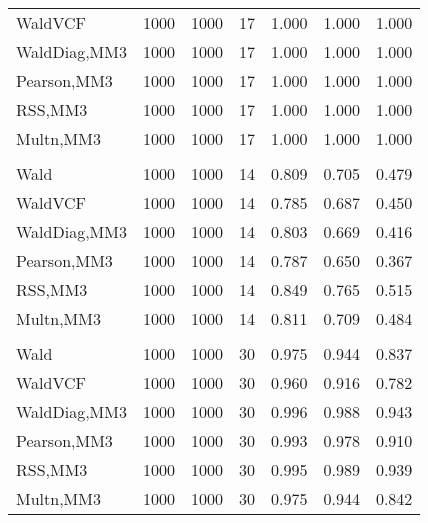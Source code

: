 \documentclass[
]{article}
\begin{document}
\begin{table}[H]
{\begin{tabular}[t]{lrrrrrr}
\hspace{1em}WaldVCF & 1000 & 1000 & 17 & 1.000 & 1.000 & 1.000\\
\hspace{1em}WaldDiag,MM3 & 1000 & 1000 & 17 & 1.000 & 1.000 & 1.000\\
\hspace{1em}Pearson,MM3 & 1000 & 1000 & 17 & 1.000 & 1.000 & 1.000\\
\hspace{1em}RSS,MM3 & 1000 & 1000 & 17 & 1.000 & 1.000 & 1.000\\
\hspace{1em}Multn,MM3 & 1000 & 1000 & 17 & 1.000 & 1.000 & 1.000\\
\addlinespace[0.3em]
\multicolumn{7}{l}{\textbf{2F 10V}}\\
\hspace{1em}Wald & 1000 & 1000 & 14 & 0.809 & 0.705 & 0.479\\
\hspace{1em}WaldVCF & 1000 & 1000 & 14 & 0.785 & 0.687 & 0.450\\
\hspace{1em}WaldDiag,MM3 & 1000 & 1000 & 14 & 0.803 & 0.669 & 0.416\\
\hspace{1em}Pearson,MM3 & 1000 & 1000 & 14 & 0.787 & 0.650 & 0.367\\
\hspace{1em}RSS,MM3 & 1000 & 1000 & 14 & 0.849 & 0.765 & 0.515\\
\hspace{1em}Multn,MM3 & 1000 & 1000 & 14 & 0.811 & 0.709 & 0.484\\
\addlinespace[0.3em]
\multicolumn{7}{l}{\textbf{3F 15V}}\\
\hspace{1em}Wald & 1000 & 1000 & 30 & 0.975 & 0.944 & 0.837\\
\hspace{1em}WaldVCF & 1000 & 1000 & 30 & 0.960 & 0.916 & 0.782\\
\hspace{1em}WaldDiag,MM3 & 1000 & 1000 & 30 & 0.996 & 0.988 & 0.943\\
\hspace{1em}Pearson,MM3 & 1000 & 1000 & 30 & 0.993 & 0.978 & 0.910\\
\hspace{1em}RSS,MM3 & 1000 & 1000 & 30 & 0.995 & 0.989 & 0.939\\
\hspace{1em}Multn,MM3 & 1000 & 1000 & 30 & 0.975 & 0.944 & 0.842\\
\bottomrule
\end{tabular}}
\endgroup{}
\end{table}
\end{document}
